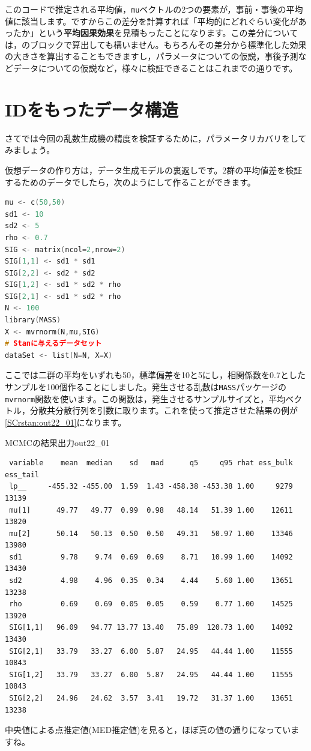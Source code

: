 \documentclass{ltjsbook}
\begin{document}
このコードで推定される平均値，\verb|mu|ベクトルの2つの要素が，事前・事後の平均値に該当します。ですからこの差分を計算すれば「平均的にどれぐらい変化があったか」という\textbf{平均因果効果}を見積もったことになります。この差分については，のブロックで算出しても構いません。もちろんその差分から標準化した効果の大きさを算出することもできますし，パラメータについての仮説，事後予測などデータについての仮説など，様々に検証できることはこれまでの通りです。

\section{IDをもったデータ構造}
さてでは今回の乱数生成機の精度を検証するために，パラメータリカバリをしてみましょう。

仮想データの作り方は，データ生成モデルの裏返しです。2群の平均値差を検証するためのデータでしたら，次のようにして作ることができます。

\begin{lstlisting}[language=c++,label={code::22_03},caption={対応ある二群の仮想データ}]
mu <- c(50,50)
sd1 <- 10
sd2 <- 5
rho <- 0.7
SIG <- matrix(ncol=2,nrow=2)
SIG[1,1] <- sd1 * sd1
SIG[2,2] <- sd2 * sd2
SIG[1,2] <- sd1 * sd2 * rho
SIG[2,1] <- sd1 * sd2 * rho
N <- 100
library(MASS)
X <- mvrnorm(N,mu,SIG)
# Stanに与えるデータセット
dataSet <- list(N=N, X=X)
\end{lstlisting}
ここでは二群の平均をいずれも50，標準偏差を10と5にし，相関係数を0.7としたサンプルを100個作ることにしました。発生させる乱数は\verb|MASS|パッケージの\verb|mvrnorm|関数を使います。この関数は，発生させるサンプルサイズと，平均ベクトル，分散共分散行列を引数に取ります。これを使って推定させた結果の例が\ref{SCrstan:out22_01}になります。
  
\begin{SCrstan}{MCMCの結果出力}{out22_01}
\begin{verbatim}
 variable    mean  median    sd   mad      q5     q95 rhat ess_bulk ess_tail
 lp__     -455.32 -455.00  1.59  1.43 -458.38 -453.38 1.00     9279    13139
 mu[1]      49.77   49.77  0.99  0.98   48.14   51.39 1.00    12611    13820
 mu[2]      50.14   50.13  0.50  0.50   49.31   50.97 1.00    13346    13980
 sd1         9.78    9.74  0.69  0.69    8.71   10.99 1.00    14092    13430
 sd2         4.98    4.96  0.35  0.34    4.44    5.60 1.00    13651    13238
 rho         0.69    0.69  0.05  0.05    0.59    0.77 1.00    14525    13920
 SIG[1,1]   96.09   94.77 13.77 13.40   75.89  120.73 1.00    14092    13430
 SIG[2,1]   33.79   33.27  6.00  5.87   24.95   44.44 1.00    11555    10843
 SIG[1,2]   33.79   33.27  6.00  5.87   24.95   44.44 1.00    11555    10843
 SIG[2,2]   24.96   24.62  3.57  3.41   19.72   31.37 1.00    13651    13238
\end{verbatim}
\end{SCrstan}
中央値による点推定値(MED推定値)を見ると，ほぼ真の値の通りになっていますね。
\end{document}
